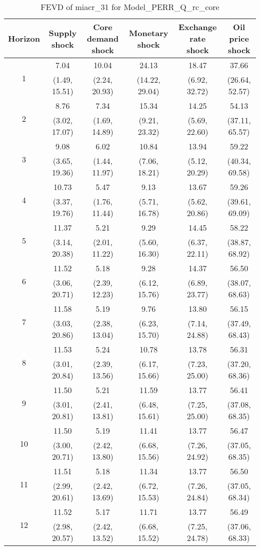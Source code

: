\documentclass{article}
\begin{document}
\begin{table}
	\footnotesize
	\caption{FEVD of miacr_31 for Model_PERR_Q_rc_core}
	\begin{tabular}{cccccc}
		Horizon & Supply shock & Core demand shock & Monetary shock & Exchange rate shock & Oil price shock\\ \hline
		\multirow{2}{*}{1} & 7.04 & 10.04 & 24.13 & 18.47 & 37.66\\
		 & (1.49, 15.51) & (2.24, 20.93) & (14.22, 29.04) & (6.92, 32.72) & (26.64, 52.57)\\
		\multirow{2}{*}{2} & 8.76 & 7.34 & 15.34 & 14.25 & 54.13\\
		 & (3.02, 17.07) & (1.69, 14.89) & (9.21, 23.32) & (5.69, 22.60) & (37.11, 65.57)\\
		\multirow{2}{*}{3} & 9.08 & 6.02 & 10.84 & 13.94 & 59.22\\
		 & (3.65, 19.36) & (1.44, 11.97) & (7.06, 18.21) & (5.12, 20.29) & (40.34, 69.58)\\
		\multirow{2}{*}{4} & 10.73 & 5.47 & 9.13 & 13.67 & 59.26\\
		 & (3.37, 19.76) & (1.76, 11.44) & (5.71, 16.78) & (5.62, 20.86) & (39.61, 69.09)\\
		\multirow{2}{*}{5} & 11.37 & 5.21 & 9.29 & 14.45 & 58.22\\
		 & (3.14, 20.38) & (2.01, 11.22) & (5.60, 16.30) & (6.37, 22.11) & (38.87, 68.92)\\
		\multirow{2}{*}{6} & 11.52 & 5.18 & 9.28 & 14.37 & 56.50\\
		 & (3.06, 20.71) & (2.39, 12.23) & (6.12, 15.76) & (6.89, 23.77) & (38.07, 68.63)\\
		\multirow{2}{*}{7} & 11.58 & 5.19 & 9.76 & 13.80 & 56.15\\
		 & (3.03, 20.86) & (2.38, 13.04) & (6.23, 15.70) & (7.14, 24.88) & (37.49, 68.43)\\
		\multirow{2}{*}{8} & 11.53 & 5.24 & 10.78 & 13.78 & 56.31\\
		 & (3.01, 20.84) & (2.39, 13.56) & (6.17, 15.66) & (7.23, 25.00) & (37.20, 68.36)\\
		\multirow{2}{*}{9} & 11.50 & 5.21 & 11.59 & 13.77 & 56.41\\
		 & (3.01, 20.81) & (2.41, 13.81) & (6.48, 15.61) & (7.25, 25.00) & (37.08, 68.35)\\
		\multirow{2}{*}{10} & 11.50 & 5.19 & 11.41 & 13.77 & 56.47\\
		 & (3.00, 20.71) & (2.42, 13.80) & (6.68, 15.56) & (7.26, 24.92) & (37.05, 68.35)\\
		\multirow{2}{*}{11} & 11.51 & 5.18 & 11.34 & 13.77 & 56.50\\
		 & (2.99, 20.61) & (2.42, 13.69) & (6.72, 15.53) & (7.26, 24.84) & (37.05, 68.34)\\
		\multirow{2}{*}{12} & 11.52 & 5.17 & 11.71 & 13.77 & 56.49\\
		 & (2.98, 20.57) & (2.42, 13.52) & (6.68, 15.52) & (7.25, 24.78) & (37.06, 68.33)\\
	\end{tabular}
\label{tab:fevd-Model_PERR_Q_rc_core-miacr_31}
\end{table}
\end{document}
